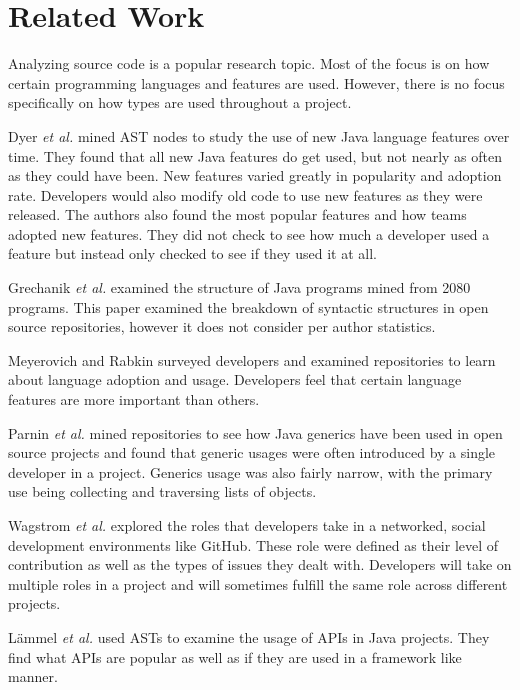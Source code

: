 \documentclass[conference]{IEEEtran}
\begin{document}
\section{Related Work}

Analyzing source code is a popular research topic. Most of the focus is on how certain programming languages and features are used. However, there is no focus specifically on how types are used throughout a project.

Dyer \textit{et al.} \cite{Dyer:2014:MBA:2568225.2568295} mined AST nodes to study the use of new Java language features over time. They found that all new Java features do get used, but not nearly as often as they could have been. New features varied greatly in popularity and adoption rate. Developers would also modify old code to use new features as they were released. The authors also found the most popular features and how teams adopted new features. They did not check to see how much a developer used a feature but instead only checked to see if they used it at all.

Grechanik \textit{et al.} \cite{Grechanik:2010:EIL:1852786.1852801} examined the structure of Java programs mined from 2080 programs. This paper examined the breakdown of syntactic structures in open source repositories, however it does not consider per author statistics. 

Meyerovich and Rabkin \cite{Meyerovich:2013:EAP:2509136.2509515} surveyed developers and examined repositories to learn about language adoption and usage. Developers feel that certain language features are more important than others.

Parnin \textit{et al.} \cite{Parnin:2011:JGA:1985441.1985446} mined repositories to see how Java generics have been used in open source projects and found that generic usages were often introduced by a single developer in a project. Generics usage was also fairly narrow, with the primary use being collecting and traversing lists of objects.

Wagstrom \textit{et al.} \cite{Patrick:Wagstrom:2012} explored the roles that developers take in a networked, social development environments like GitHub. These role were defined as their level of contribution as well as the types of issues they dealt with. Developers will take on multiple roles in a project and will sometimes fulfill the same role across different projects.

L\"{a}mmel \textit{et al.} \cite{Lammel:2011:LAA:1982185.1982471} used ASTs to examine the usage of APIs in Java projects. They find what APIs are popular as well as if they are used in a framework like manner.
\end{document}
